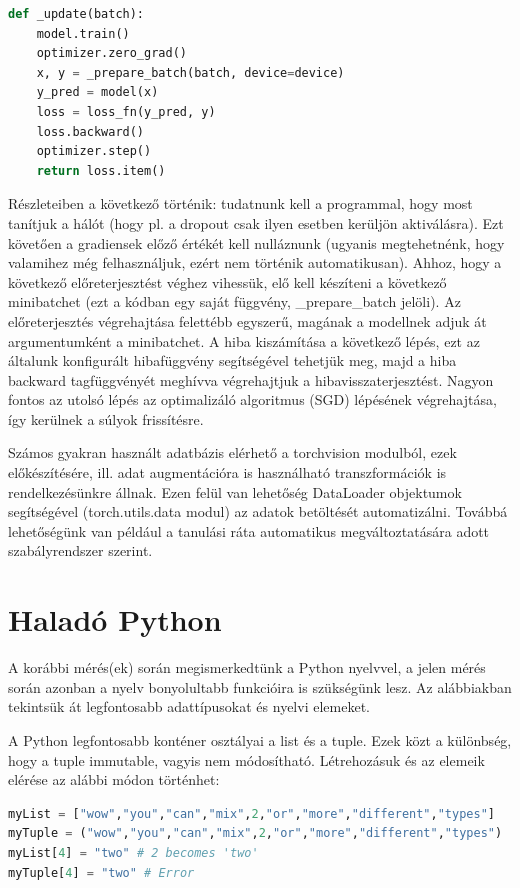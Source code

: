 \documentclass[12pt,a4paper,oneside]{report}             %
\begin{document}
\begin{lstlisting}[language=Python]
def _update(batch):
	model.train()
	optimizer.zero_grad()
	x, y = _prepare_batch(batch, device=device)
	y_pred = model(x)
	loss = loss_fn(y_pred, y)
	loss.backward()
	optimizer.step()
	return loss.item()
\end{lstlisting}

Részleteiben a következő történik: tudatnunk kell a programmal, hogy most tanítjuk a hálót (hogy pl. a dropout csak ilyen esetben kerüljön aktiválásra). Ezt követően a gradiensek előző értékét kell nulláznunk (ugyanis megtehetnénk, hogy valamihez még felhasználjuk, ezért nem történik automatikusan). Ahhoz, hogy a következő előreterjesztést véghez vihessük, elő kell készíteni a következő minibatchet (ezt a kódban egy saját függvény, \_prepare\_batch jelöli). Az előreterjesztés végrehajtása felettébb egyszerű, magának a modellnek adjuk át argumentumként a minibatchet. A hiba kiszámítása a következő lépés, ezt az általunk konfigurált hibafüggvény segítségével tehetjük meg, majd a hiba backward tagfüggvényét meghívva végrehajtjuk a hibavisszaterjesztést. Nagyon fontos az utolsó lépés az optimalizáló algoritmus (SGD) lépésének végrehajtása, így kerülnek a súlyok frissítésre.

Számos gyakran használt adatbázis elérhető a torchvision modulból, ezek előkészítésére, ill. adat augmentációra is használható transzformációk is rendelkezésünkre állnak. Ezen felül van lehetőség DataLoader objektumok segítségével (torch.utils.data modul) az adatok betöltését automatizálni. Továbbá lehetőségünk van például a tanulási ráta automatikus megváltoztatására adott szabályrendszer szerint.

\section{Haladó Python}

A korábbi mérés(ek) során megismerkedtünk a Python nyelvvel, a jelen mérés során azonban a nyelv bonyolultabb funkcióira is szükségünk lesz. Az alábbiakban tekintsük át legfontosabb adattípusokat és nyelvi elemeket.

A Python legfontosabb konténer osztályai a list és a tuple. Ezek közt a különbség, hogy a tuple immutable, vagyis nem módosítható. Létrehozásuk és az elemeik elérése az alábbi módon történhet:

\begin{lstlisting}[language=Python]
myList = ["wow","you","can","mix",2,"or","more","different","types"]
myTuple = ("wow","you","can","mix",2,"or","more","different","types")
myList[4] = "two" # 2 becomes 'two'
myTuple[4] = "two" # Error
\end{lstlisting}
\end{document}
